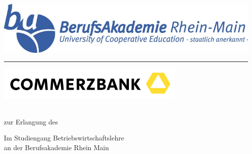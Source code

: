 \begin{titlepage}
\begin{center}
    \includegraphics{pictures/ba-logo.jpg}
    \vspace{1cm}
    \hrule
    
    \vspace{1cm}
    
    {\fontsize{20}{24} \selectfont \textbf{\docTitle}}
    
    \vspace{1cm}
    
    \includegraphics[width=0.7\textwidth]{pictures/Commerzbank-Logo.png}
    
    \vspace{0.5cm}
    
    {\fontsize{14}{18} \selectfont \docType}\\
    {\fontsize{14}{18} \selectfont zur Erlangung des}\\
    {\fontsize{14}{18} \selectfont \docGraduation}
    
    \vspace{1cm}
    
    {\fontsize{14}{18} \selectfont Im Studiengang Betriebswirtschaftslehre}\\
    {\fontsize{14}{18} \selectfont an der Berufsakademie Rhein Main}
    
\end{center}

\vspace{1cm}


\end{titlepage}
